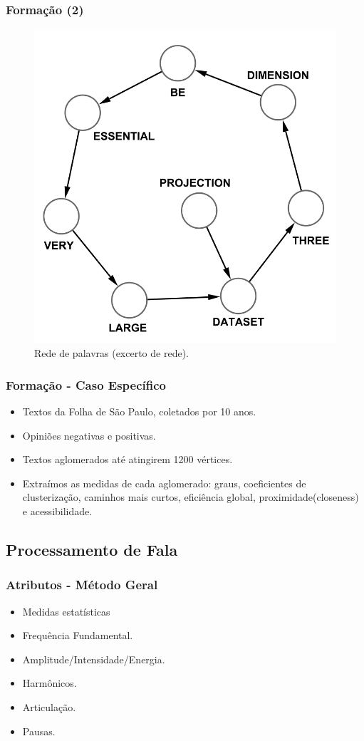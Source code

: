 \documentclass{beamer}
\begin{document}
      \frame
      {
        \frametitle{Formação (2)}
      \begin{figure}[!h]
        \begin{center}
                \includegraphics[width=.5\textwidth]{grafo-palavras}
        \end{center}
        \caption{Rede de palavras (excerto de rede).}
      \end{figure}
      }

      \frame
      {
        \frametitle{Formação - Caso Específico}
          \begin{itemize}
            \item Textos da Folha de São Paulo, coletados por 10 anos.
            \item Opiniões negativas e positivas.
            \item Textos aglomerados até atingirem 1200 vértices.
            \item Extraímos as medidas de cada aglomerado: graus, coeficientes de clusterização, caminhos mais curtos, eficiência global, proximidade(closeness) e acessibilidade.


        \end{itemize}
      }

   \subsection{Processamento de Fala}
      \frame
      {
        \frametitle{Atributos - Método Geral}
          \begin{itemize}
          \item Medidas estatísticas
          \item Frequência Fundamental.
          \item Amplitude/Intensidade/Energia.
          \item Harmônicos.
          \item Articulação.
          \item Pausas.
        \end{itemize}
      }
\end{document}
